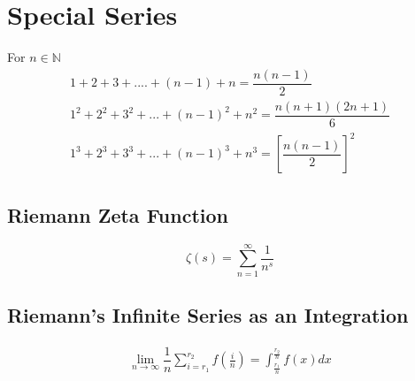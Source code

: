 \documentclass[../main.tex]{subfiles}
\begin{document}
	
	\section{Special Series}
	For $n\in\mathbb{N}$
	\begin{align}
		1+2+3+....+(n-1)+n=\dfrac{n(n-1)}{2}\\
		1^2+2^2+3^2+...+(n-1)^2+n^2=\dfrac{n(n+1)(2n+1)}{6}\\
		1^3+2^3+3^3+...+(n-1)^3+n^3=[\dfrac{n(n-1)}{2}]^2
	\end{align}
	\subsection{Riemann Zeta Function}
	\begin{equation}
		\zeta(s)=\sum_{n=1}^\infty \dfrac{1}{n^s}
	\end{equation}
	\subsection{Riemann's Infinite Series as an Integration}
	\label{riemannsum}
	\begin{align}
		\lim_{n\to\infty} \dfrac{1}{n}\sum_{i=r_1}^{r_2} f(\frac{i}{n}) = \displaystyle\int_{\frac{r_1}{n}}^{\frac{r_2}{n}} f(x) dx
	\end{align}
\end{document}
